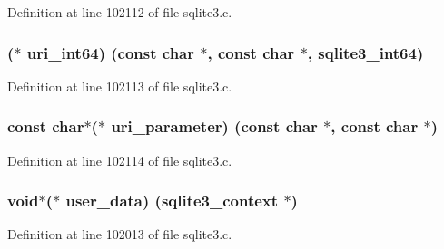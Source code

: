 Definition at line 102112 of file sqlite3.\+c.

\hypertarget{structsqlite3__api__routines_a2ce954afa2ad1e413234a4412378af04}{}
\subsubsection[{uri\+\_\+int64}]{($\ast$ uri\+\_\+int64) (const char $\ast$, const char $\ast$, {\bf sqlite3\+\_\+int64})}\label{structsqlite3__api__routines_a2ce954afa2ad1e413234a4412378af04}


Definition at line 102113 of file sqlite3.\+c.

\hypertarget{structsqlite3__api__routines_a1b4ccc1050d61f2addba3a5acc6c8bbc}{}
\subsubsection[{uri\+\_\+parameter}]{\setlength{\rightskip}{0pt plus 5cm}const char$\ast$($\ast$ uri\+\_\+parameter) (const char $\ast$, const char $\ast$)}\label{structsqlite3__api__routines_a1b4ccc1050d61f2addba3a5acc6c8bbc}


Definition at line 102114 of file sqlite3.\+c.

\hypertarget{structsqlite3__api__routines_a53fe3c5bee52784ecc5da8b1f2f6f562}{}
\subsubsection[{user\+\_\+data}]{\setlength{\rightskip}{0pt plus 5cm}void$\ast$($\ast$ user\+\_\+data) ({\bf sqlite3\+\_\+context} $\ast$)}\label{structsqlite3__api__routines_a53fe3c5bee52784ecc5da8b1f2f6f562}


Definition at line 102013 of file sqlite3.\+c.

\hypertarget{structsqlite3__api__routines_af0cad7cef3019e2ab150b694894b65ec}{}
